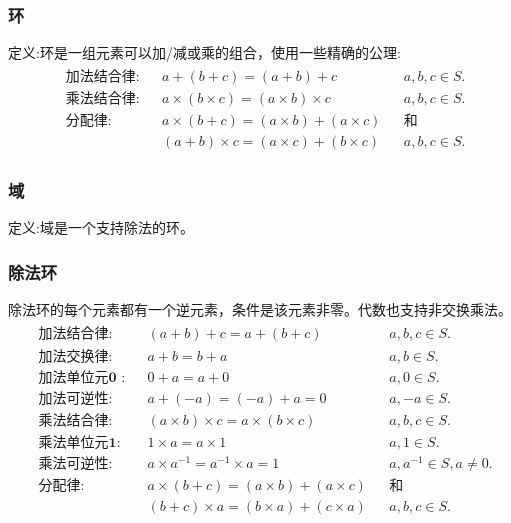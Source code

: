 \subsubsection*{环}
定义:环是一组元素可以加/减或乘的组合，使用一些精确的公理:
\begin{align*}
    \begin{aligned}
        & \textbf{加法结合律:} && a+(b+c)=(a+b)+c && a, b, c \in S.\\
        & \textbf{乘法结合律:} && a \times(b \times c)=(a \times b) \times c && a, b, c \in S.\\
        & \textbf{分配律:} && a \times(b+c)=(a \times b)+(a \times c) && \text{和}\\
&&& (a+b) \times c=(a \times c)+(b \times c) && a, b, c \in S.
    \end{aligned}
\end{align*}


\subsubsection*{域}
定义:域是一个支持除法的环。

\subsubsection*{除法环}
除法环的每个元素都有一个逆元素，条件是该元素非零。代数也支持非交换乘法。
\begin{align*}
    \begin{aligned}
        &\textbf{加法结合律:}    && (a+b)+c=a+(b+c) && a, b, c \in S . \\
        &\textbf{加法交换律:}    && a+b=b+a && a, b \in S . \\
        &\textbf{加法单位元0 :}  && 0+a=a+0 && a, 0 \in S . \\
        &\textbf{加法可逆性:}    && a+(-a)=(-a)+a=0 && a,-a \in S . \\
        &\textbf{乘法结合律:}    && (a \times b) \times c=a \times(b \times c) && a, b, c \in S . \\
        &\textbf{乘法单位元1:}   && 1 \times a=a \times 1 && a, 1 \in S . \\
        &\textbf{乘法可逆性:}    && a \times a^{-1}=a^{-1} \times a=1 && a, a^{-1} \in S, a \neq 0 . \\
        &\textbf{分配律:}        && a \times(b+c)=(a \times b)+(a \times c) && \text {和 } \\
        &                    &&(b+c) \times a=(b \times a)+(c \times a) && a, b, c \in S .
    \end{aligned}
\end{align*}

